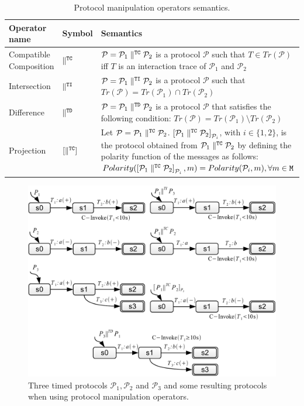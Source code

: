 \begin{table}[thbp]
{\footnotesize
\begin{center}
\begin{tabular}{|p{2.5cm}|p{1.2cm}|p{8.3cm}|}
%
\hline
%
\textbf{Operator name} & \textbf{Symbol} &  \textbf{Semantics}\\ \hline
%
Compatible Composition & $\parallel^{\mathtt{TC}}$  & $\mathcal{P} = \mathcal{P}_1 \parallel^{\mathtt{TC}} \mathcal{P}_2$ is a protocol $\mathcal{P}$ such that
$T \in Tr(\mathcal{P})$ iff  $T$  is an interaction trace of  $\mathcal{P}_1$ and $\mathcal{P}_2$ \\ \hline
%
Intersection  & $\parallel^{\mathtt{TI}}$ & $\mathcal{P} = \mathcal{P}_1 \parallel^{\mathtt{TI}} \mathcal{P}_2$ is a protocol $\mathcal{P}$ such that
$Tr(\mathcal{P}) =  Tr(\mathcal{P}_1) \cap Tr(\mathcal{P}_2)$ \\ \hline
Difference  & $\parallel^{\mathtt{TD}}$ & $\mathcal{P} = \mathcal{P}_1 \parallel^{\mathtt{TD}} \mathcal{P}_2$ is a protocol $\mathcal{P}$ that satisfies the following condition:
$Tr(\mathcal{P}) = Tr(\mathcal{P}_1) \setminus Tr(\mathcal{P}_2) $  \\ \hline
 Projection & $\left[  \parallel^{\mathtt{TC}}  \right]_{}$ &  Let $\mathcal{P} = \mathcal{P}_1 \parallel^{\mathtt{TC}} \mathcal{P}_2$. $\left[ \mathcal{P}_1 \parallel^{\mathtt{TC}} \mathcal{P}_2 \right]_{\mathcal{P}_i}$, with $i \in \{1, 2\}$,
is the protocol  obtained from $\mathcal{P}_1 \parallel^{\mathtt{TC}} \mathcal{P}_2$
by defining  the polarity function of the messages as follows: $Polarity(\left[ \mathcal{P}_1 \parallel^{\mathtt{TC}} \mathcal{P}_2 \right]_{\mathcal{P}_i}, m) = Polarity(\mathcal{P}_i, m), \forall m \in \mathtt{M}$ \\ \hline
\end{tabular}
\caption{Protocol manipulation operators semantics.}
\label{tab:operators}
\end{center}
}
\end{table}

\begin{figure}[thbp]
    \centering
    \includegraphics[width=\textwidth]{content/protocol-analysis/operators}
    \caption{Three timed protocols $\mathcal{P}_1, \mathcal{P}_2$ and $\mathcal{P}_3$ and some resulting protocols when using protocol manipulation operators.}
    \label{fig:operators}
\end{figure}

